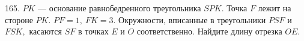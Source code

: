 165. $PK$ --- основание равнобедренного треугольника $SPK.$ Точка $F$ лежит на стороне $PK.$ $PF=1,\ FK=3.$ Окружности, вписанные в треугольники $PSF$ и $FSK,$ касаются $SF$ в точках $E$ и $O$ соответственно. Найдите длину отрезка $OE.$\\
